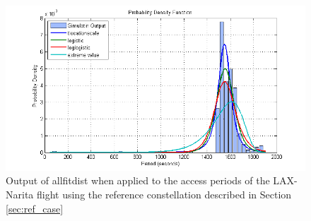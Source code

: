 \begin{figure}[htbp]
	\centering
	\includegraphics[scale = 0.75]{Pictures/allfitdist_Narita.png}
	
	\caption{Output of allfitdist when applied to the access periods of the LAX-Narita flight using the reference constellation described in Section \ref{sec:ref_case}}
	\label{fig:allfitdist_Narita}
\end{figure} 
